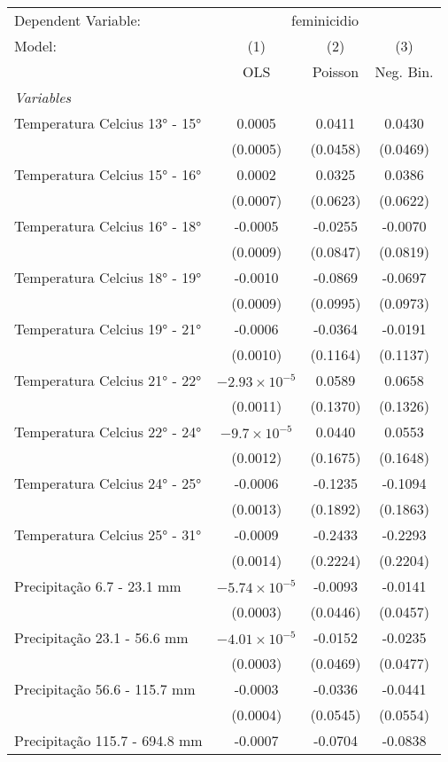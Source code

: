 \documentclass[
]{article}
\begin{document}
\begin{tabular}{lccc}
\tabularnewline\midrule\midrule
Dependent Variable:&\multicolumn{3}{c}{feminicidio}\\
Model:&(1) & (2) & (3)\\
 &  OLS & Poisson & Neg. Bin.\\
\midrule \emph{Variables}&   &   &  \\
Temperatura Celcius 13° - 15° & 0.0005 & 0.0411 & 0.0430\\
  &(0.0005) & (0.0458) & (0.0469)\\
Temperatura Celcius 15° - 16° & 0.0002 & 0.0325 & 0.0386\\
  &(0.0007) & (0.0623) & (0.0622)\\
Temperatura Celcius 16° - 18° & -0.0005 & -0.0255 & -0.0070\\
  &(0.0009) & (0.0847) & (0.0819)\\
Temperatura Celcius 18° - 19° & -0.0010 & -0.0869 & -0.0697\\
  &(0.0009) & (0.0995) & (0.0973)\\
Temperatura Celcius 19° - 21° & -0.0006 & -0.0364 & -0.0191\\
  &(0.0010) & (0.1164) & (0.1137)\\
Temperatura Celcius 21° - 22° & $-2.93\times 10^{-5}$ & 0.0589 & 0.0658\\
  &(0.0011) & (0.1370) & (0.1326)\\
Temperatura Celcius 22° - 24° & $-9.7\times 10^{-5}$ & 0.0440 & 0.0553\\
  &(0.0012) & (0.1675) & (0.1648)\\
Temperatura Celcius 24° - 25° & -0.0006 & -0.1235 & -0.1094\\
  &(0.0013) & (0.1892) & (0.1863)\\
Temperatura Celcius 25° - 31° & -0.0009 & -0.2433 & -0.2293\\
  &(0.0014) & (0.2224) & (0.2204)\\
Precipitação 6.7 - 23.1 mm & $-5.74\times 10^{-5}$ & -0.0093 & -0.0141\\
  &(0.0003) & (0.0446) & (0.0457)\\
Precipitação 23.1 - 56.6 mm & $-4.01\times 10^{-5}$ & -0.0152 & -0.0235\\
  &(0.0003) & (0.0469) & (0.0477)\\
Precipitação 56.6 - 115.7 mm & -0.0003 & -0.0336 & -0.0441\\
  &(0.0004) & (0.0545) & (0.0554)\\
Precipitação 115.7 - 694.8 mm & -0.0007 & -0.0704 & -0.0838\\

\end{tabular}
\end{document}
